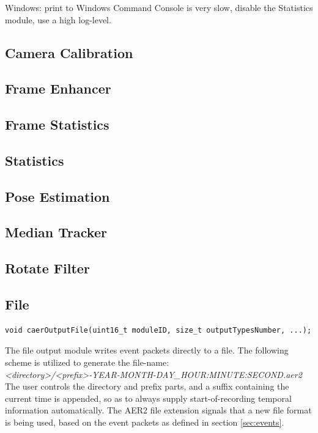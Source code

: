 \documentclass[a4paper,12pt]{report}
\begin{document}
Windows: print to Windows Command Console is very slow, disable the Statistics module, use a high log-level.

\subsection{Camera Calibration}
\subsection{Frame Enhancer}
\subsection{Frame Statistics}
\subsection{Statistics}
\subsection{Pose Estimation}
\subsection{Median Tracker}
\subsection{Rotate Filter}

\subsection{File} \label{subsec:file}

\begin{lstlisting}
void caerOutputFile(uint16_t moduleID, size_t outputTypesNumber, ...);
\end{lstlisting}

The file output module writes event packets directly to a file.
The following scheme is utilized to generate the file-name:
\\\emph{<directory>/<prefix>-YEAR-MONTH-DAY\_HOUR:MINUTE:SECOND.aer2}
\\The user controls the directory and prefix parts, and a suffix containing the current time is appended, so as to always supply start-of-recording temporal information automatically.
The AER2 file extension signals that a new file format is being used, based on the event packets as defined in section \ref{sec:events}.
\end{document}
